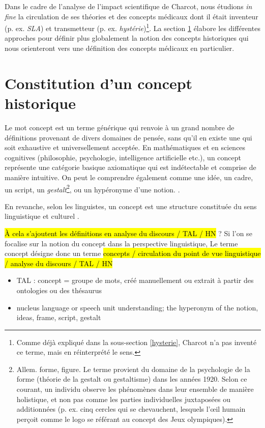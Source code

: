 Dans le cadre de l'analyse de l'impact scientifique de Charcot, nous étudions \textit{in fine} la circulation de ses théories et des concepts médicaux dont il était inventeur (p. ex. \textit{SLA}) et transmetteur (p. ex. \textit{hystérie})\footnote{Comme déjà expliqué dans la sous-section \ref{hysterie}, Charcot n'a pas inventé ce terme, mais en réinterprété le sens.}. La section \ref{concept} élabore les différentes approches pour définir plus globalement la notion des concepts historiques qui nous orienteront vers une définition des concepts médicaux en particulier.

\section{Constitution d'un concept historique}
\label{concept}

Le mot \og{}concept\fg{} est un terme générique qui renvoie  à un grand nombre de définitions provenant de divers domaines de pensée, sans qu'il en existe une qui soit exhaustive et universellement acceptée. En mathématiques et en sciences cognitives (philosophie, psychologie, intelligence artificielle etc.), un concept représente une catégorie basique axiomatique qui est indétectable et comprise de manière intuitive. On peut le comprendre également comme une idée, un cadre, un script, un \textit{gestalt}\footnote{Allem. \og{}forme, figure\fg{}. Le terme provient du domaine de la psychologie de la forme (théorie de la gestalt ou gestaltisme) dans les années 1920. Selon ce courant, un individu observe les phénomènes dans leur ensemble de manière holistique, et non pas comme les parties individuelles juxtaposées ou additionnées (p. ex. cinq cercles qui se chevauchent, lesquels l'{\oe}il humain perçoit comme le logo se référant au concept des Jeux olympiques).}, ou un hypéronyme d'une notion. \citep{lihachev1997}. 

En revanche, selon les linguistes, un concept est une structure constituée du sens linguistique et culturel
 \citep{nemickiene2011concept}.
 
 \hl{À cela s'ajoutent les définitions en analyse du discours / TAL / HN} ? Si l'on se focalise sur la notion du concept dans la perspective linguistique, Le terme \og{}concept\fg{} désigne donc un terme 
\hl{concepts / circulation du point de vue linguistique / analyse du discours / TAL / HN} 
\begin{itemize}
\item TAL : concept = groupe de mots, créé manuellement ou extrait à partir des ontologies ou des thésaurus
\item nucleus language or speech unit
understanding; the hyperonym of the notion, ideas, frame, script, gestalt 
\end{itemize}



